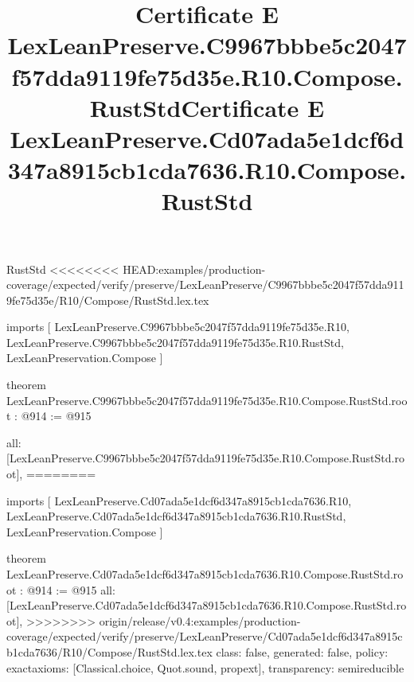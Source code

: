 \begin{lexlean}{RustStd}
<<<<<<<< HEAD:examples/production-coverage/expected/verify/preserve/LexLeanPreserve/C9967bbbe5c2047f57dda9119fe75d35e/R10/Compose/RustStd.lex.tex
\title{Certificate E LexLeanPreserve.C9967bbbe5c2047f57dda9119fe75d35e.R10.Compose.RustStd}
\begin{coremodule}
imports [
  LexLeanPreserve.C9967bbbe5c2047f57dda9119fe75d35e.R10,
  LexLeanPreserve.C9967bbbe5c2047f57dda9119fe75d35e.R10.RustStd,
  LexLeanPreservation.Compose
]

theorem LexLeanPreserve.C9967bbbe5c2047f57dda9119fe75d35e.R10.Compose.RustStd.root : @914 := @915 {
  all: [LexLeanPreserve.C9967bbbe5c2047f57dda9119fe75d35e.R10.Compose.RustStd.root],
========
\title{Certificate E LexLeanPreserve.Cd07ada5e1dcf6d347a8915cb1cda7636.R10.Compose.RustStd}
\begin{coremodule}
imports [
  LexLeanPreserve.Cd07ada5e1dcf6d347a8915cb1cda7636.R10,
  LexLeanPreserve.Cd07ada5e1dcf6d347a8915cb1cda7636.R10.RustStd,
  LexLeanPreservation.Compose
]

theorem LexLeanPreserve.Cd07ada5e1dcf6d347a8915cb1cda7636.R10.Compose.RustStd.root : @914 := @915 {
  all: [LexLeanPreserve.Cd07ada5e1dcf6d347a8915cb1cda7636.R10.Compose.RustStd.root],
>>>>>>>> origin/release/v0.4:examples/production-coverage/expected/verify/preserve/LexLeanPreserve/Cd07ada5e1dcf6d347a8915cb1cda7636/R10/Compose/RustStd.lex.tex
  class: false,
  generated: false,
  policy: exact{axioms: [Classical.choice, Quot.sound, propext]},
  transparency: semireducible
}


\end{coremodule}}
\end{coremodule}
\end{lexlean}
